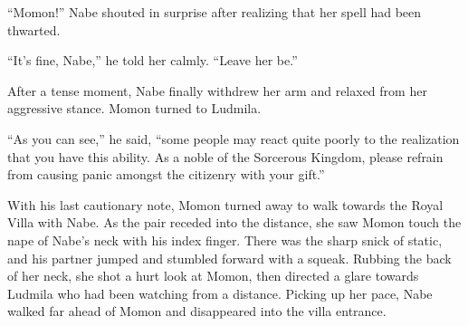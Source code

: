 “Momon!” Nabe shouted in surprise after realizing that her spell had been thwarted.

 

“It’s fine, Nabe,” he told her calmly. “Leave her be.”

 

After a tense moment, Nabe finally withdrew her arm and relaxed from her aggressive stance. Momon turned to Ludmila.

 

“As you can see,” he said, “some people may react quite poorly to the realization that you have this ability. As a noble of the Sorcerous Kingdom, please refrain from causing panic amongst the citizenry with your gift.”

 

With his last cautionary note, Momon turned away to walk towards the Royal Villa with Nabe. As the pair receded into the distance, she saw Momon touch the nape of Nabe’s neck with his index finger. There was the sharp snick of static, and his partner jumped and stumbled forward with a squeak. Rubbing the back of her neck, she shot a hurt look at Momon, then directed a glare towards Ludmila who had been watching from a distance. Picking up her pace, Nabe walked far ahead of Momon and disappeared into the villa entrance.
